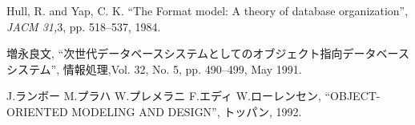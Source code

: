 \begin{thebibliography}{参考文献}
  Hull, R. and Yap, C. K.
  ``The Format model: A theory of database organization'',
  {\it JACM 31,}3,
  pp. 518--537, 1984.

  増永良文,
  ``次世代データベースシステムとしてのオブジェクト指向データベースシステム'',
  情報処理,Vol. 32, No. 5,
  pp. 490--499, May 1991.


  J.ランボー M.プラハ W.プレメラニ F.エディ W.ローレンセン,
  ``OBJECT-ORIENTED MODELING AND DESIGN'',
  トッパン, 1992.



\end{thebibliography}
